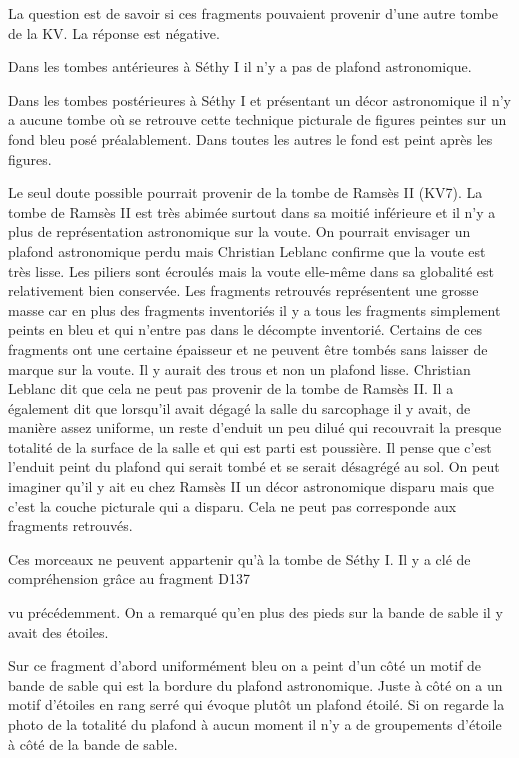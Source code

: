 \documentclass{article}
\begin{document}
La question est de savoir si ces fragments pouvaient provenir d’une
autre tombe de la KV. La réponse est négative.

Dans les tombes antérieures à Séthy I il n’y a pas de plafond
astronomique. 

Dans les tombes postérieures à Séthy I et présentant un décor
astronomique il n’y a aucune tombe où se retrouve cette technique
picturale de figures peintes sur un fond bleu posé préalablement. Dans
toutes les autres le fond est  peint  après les figures.

Le seul doute possible pourrait provenir de la tombe de Ramsès II (KV7).
La tombe de Ramsès II est très abimée surtout dans sa moitié inférieure
et il n’y a plus de représentation astronomique sur la voute. On
pourrait envisager un plafond astronomique perdu mais Christian Leblanc
confirme que la voute est très lisse. Les piliers sont écroulés mais la
voute elle-même dans sa globalité est relativement bien conservée. Les
fragments retrouvés représentent une grosse masse car en plus des
fragments inventoriés il y a tous les fragments simplement  peints en
bleu et qui n’entre pas dans le décompte inventorié. Certains de ces
fragments ont une certaine épaisseur et ne peuvent être tombés sans
laisser de marque sur la voute. Il y aurait des trous et non un plafond
lisse. Christian Leblanc dit que cela ne peut pas provenir de la tombe
de Ramsès II. Il a également dit que lorsqu’il avait dégagé la salle du
sarcophage il y avait, de manière assez uniforme, un reste d’enduit un
peu dilué qui recouvrait la presque totalité de la surface de la salle
et qui est parti est poussière.  Il pense que c’est l’enduit peint du
plafond qui serait tombé et se serait désagrégé au sol. On peut
imaginer qu’il y ait eu chez Ramsès II un décor astronomique disparu
mais que c’est la couche picturale qui a disparu. Cela ne peut pas
corresponde aux fragments retrouvés. 

Ces morceaux ne peuvent appartenir qu’à la tombe de Séthy I.  Il y a clé
de compréhension grâce au fragment D137 

vu précédemment. On a remarqué qu’en plus des pieds sur la bande de
sable il y avait des étoiles.  

Sur ce fragment d’abord uniformément bleu on a peint d’un côté un motif
de bande de sable qui est la bordure du plafond astronomique. Juste à
côté on a un motif d’étoiles en rang serré qui évoque plutôt un plafond
étoilé. Si on regarde la photo de la totalité du plafond à aucun moment
il n’y a de groupements d’étoile à côté de la bande de sable. 
\end{document}
